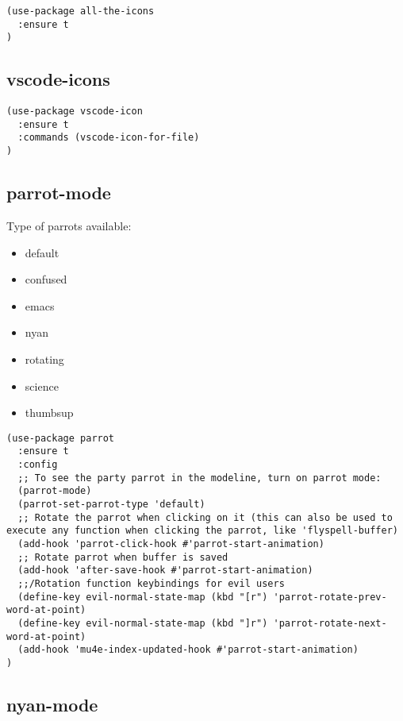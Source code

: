 \documentclass[11pt]{article}
\begin{document}
\begin{verbatim}
(use-package all-the-icons
  :ensure t
)
\end{verbatim}

\subsection*{vscode-icons}
\label{sec:org954da37}

\begin{verbatim}
(use-package vscode-icon
  :ensure t
  :commands (vscode-icon-for-file)
)
\end{verbatim}

\subsection*{parrot-mode}
\label{sec:org60d5ae2}

Type of parrots available:

\begin{itemize}
\item default
\item confused
\item emacs
\item nyan
\item rotating
\item science
\item thumbsup
\end{itemize}

\begin{verbatim}
(use-package parrot
  :ensure t
  :config
  ;; To see the party parrot in the modeline, turn on parrot mode:
  (parrot-mode)
  (parrot-set-parrot-type 'default)
  ;; Rotate the parrot when clicking on it (this can also be used to execute any function when clicking the parrot, like 'flyspell-buffer)
  (add-hook 'parrot-click-hook #'parrot-start-animation)
  ;; Rotate parrot when buffer is saved
  (add-hook 'after-save-hook #'parrot-start-animation)
  ;;/Rotation function keybindings for evil users
  (define-key evil-normal-state-map (kbd "[r") 'parrot-rotate-prev-word-at-point)
  (define-key evil-normal-state-map (kbd "]r") 'parrot-rotate-next-word-at-point)
  (add-hook 'mu4e-index-updated-hook #'parrot-start-animation)
)
\end{verbatim}

\subsection*{nyan-mode}
\label{sec:orge35b057}
\end{document}
